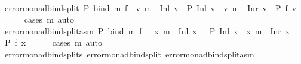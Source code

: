 \begin{isabellebody}
\ \ \isanewline
\ \ \isanewline
\ \ \isamarkupfalse%
\ error{\isacharunderscore}{\kern0pt}monad{\isacharunderscore}{\kern0pt}bind{\isacharunderscore}{\kern0pt}split{\isacharcolon}{\kern0pt}\ {\isachardoublequoteopen}P\ {\isacharparenleft}{\kern0pt}bind\ m\ f{\isacharparenright}{\kern0pt}\ {\isasymlongleftrightarrow}\ {\isacharparenleft}{\kern0pt}{\isasymforall}v{\isachardot}{\kern0pt}\ m\ {\isacharequal}{\kern0pt}\ Inl\ v\ {\isasymlongrightarrow}\ P\ {\isacharparenleft}{\kern0pt}Inl\ v{\isacharparenright}{\kern0pt}{\isacharparenright}{\kern0pt}\ {\isasymand}\ {\isacharparenleft}{\kern0pt}{\isasymforall}v{\isachardot}{\kern0pt}\ m\ {\isacharequal}{\kern0pt}\ Inr\ v\ {\isasymlongrightarrow}\ P\ {\isacharparenleft}{\kern0pt}f\ v{\isacharparenright}{\kern0pt}{\isacharparenright}{\kern0pt}{\isachardoublequoteclose}\isanewline
%
\isadelimproof
\ \ \ \ %
\endisadelimproof
%
\isatagproof
{}\isamarkupfalse%
\ {\isacharparenleft}{\kern0pt}cases\ m{\isacharparenright}{\kern0pt}\ auto%
\endisatagproof
{\isafoldproof}%
%
\isadelimproof
\isanewline
%
\endisadelimproof
\ \ \isanewline
\ \ \isamarkupfalse%
\ error{\isacharunderscore}{\kern0pt}monad{\isacharunderscore}{\kern0pt}bind{\isacharunderscore}{\kern0pt}split{\isacharunderscore}{\kern0pt}asm{\isacharcolon}{\kern0pt}\ {\isachardoublequoteopen}P\ {\isacharparenleft}{\kern0pt}bind\ m\ f{\isacharparenright}{\kern0pt}\ {\isasymlongleftrightarrow}\ {\isasymnot}\ {\isacharparenleft}{\kern0pt}{\isasymexists}x{\isachardot}{\kern0pt}\ m\ {\isacharequal}{\kern0pt}\ Inl\ x\ {\isasymand}\ {\isasymnot}\ P\ {\isacharparenleft}{\kern0pt}Inl\ x{\isacharparenright}{\kern0pt}\ {\isasymor}\ {\isacharparenleft}{\kern0pt}{\isasymexists}x{\isachardot}{\kern0pt}\ m\ {\isacharequal}{\kern0pt}\ Inr\ x\ {\isasymand}\ {\isasymnot}\ P\ {\isacharparenleft}{\kern0pt}f\ x{\isacharparenright}{\kern0pt}{\isacharparenright}{\kern0pt}{\isacharparenright}{\kern0pt}{\isachardoublequoteclose}\isanewline
%
\isadelimproof
\ \ \ \ %
\endisadelimproof
%
\isatagproof
{}\isamarkupfalse%
\ {\isacharparenleft}{\kern0pt}cases\ m{\isacharparenright}{\kern0pt}\ auto%
\endisatagproof
{\isafoldproof}%
%
\isadelimproof
\isanewline
%
\endisadelimproof
\ \ \isanewline
\ \ \isamarkupfalse%
\ error{\isacharunderscore}{\kern0pt}monad{\isacharunderscore}{\kern0pt}bind{\isacharunderscore}{\kern0pt}splits\ {\isacharequal}{\kern0pt}error{\isacharunderscore}{\kern0pt}monad{\isacharunderscore}{\kern0pt}bind{\isacharunderscore}{\kern0pt}split\ error{\isacharunderscore}{\kern0pt}monad{\isacharunderscore}{\kern0pt}bind{\isacharunderscore}{\kern0pt}split{\isacharunderscore}{\kern0pt}asm\isanewline
\ \ \isanewline
%
\isadelimtheory
\ \ \isanewline
%
\endisadelimtheory
%
\isatagtheory
{}\isamarkupfalse%
%
\endisatagtheory
{\isafoldtheory}%
%
\isadelimtheory
%
\endisadelimtheory
%
\end{isabellebody}%
